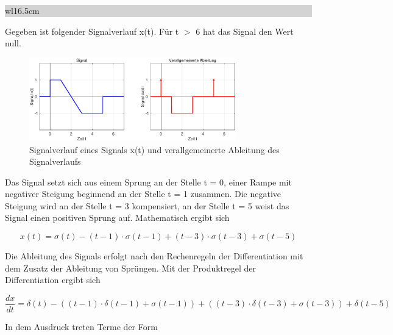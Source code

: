 \noindent
\colorbox{lightgray}{%
%
\renewcommand\arraystretch{0.6}%
\begin{tabular}{ wl{16.5cm} }
{\selectfont
{}} 
\end{tabular}%
}\bigskip

\noindent Gegeben ist folgender Signalverlauf x(t). F\"{u}r t $\mathrm{>}$ 6 hat das Signal den Wert null.

\begin{figure}[H]
  \centerline{\includegraphics[width=0.8\textwidth]{Kapitel1/Bilder/image20}}
  \caption{Signalverlauf eines Signals x(t) und verallgemeinerte Ableitung des Signalverlaufs}
  \label{fig:BeispielFunktionsalgebra}
\end{figure}

\noindent Das Signal setzt sich aus einem Sprung an der Stelle t = 0, einer Rampe mit negativer Steigung beginnend an der Stelle t = 1 zusammen. Die negative Steigung wird an der Stelle t = 3 kompensiert, an der Stelle t = 5 weist das Signal einen positiven Sprung auf. Mathematisch ergibt sich


\begin{equation}\label{eq:onesixtyone}
x\left(t\right)=\sigma \left(t\right)-\left(t-1\right)\cdot \sigma \left(t-1\right)+\left(t-3\right)\cdot \sigma \left(t-3\right)+\sigma \left(t-5\right)
\end{equation}

\noindent Die Ableitung des Signals erfolgt nach den Rechenregeln der Differentiation mit dem Zusatz der Ableitung von Spr\"{u}ngen. Mit der Produktregel der Differentiation ergibt sich

\begin{equation}\label{eq:onesixtytwo}
\dfrac{dx}{dt} =\delta \left(t\right)-\left(\left(t-1\right)\cdot \delta \left(t-1\right)+\sigma \left(t-1\right)\right)+\left(\left(t-3\right)\cdot \delta \left(t-3\right)+\sigma \left(t-3\right)\right)+\delta \left(t-5\right)
\end{equation}

\noindent In dem Ausdruck treten Terme der Form 


